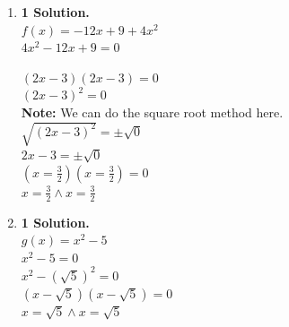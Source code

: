 \begin{example}
  \hfill
  \begin{enumerate}
  \item \textbf{1 Solution.} \\
    $f(x) = -12x + 9 + 4x^2$ \\
    $4x^2 - 12x + 9 = 0$ \\
    \begin{center}
    \end{center}
    $(2x - 3)(2x - 3) = 0$ \\
    $(2x - 3)^2 = 0$ \\
    \textbf{Note: } We can do the square root method here. \\
    $\sqrt{(2x - 3)^2} = \pm \sqrt{0}$ \\
    $2x - 3 = \pm \sqrt{0}$ \\
    $(x = \frac{3}{2}) (x = \frac{3}{2}) = 0$ \\
    $x = \frac{3}{2} \land x = \frac{3}{2}$
  \item \textbf{1 Solution.} \\
    $g(x) = x^2 - 5$ \\
    $x^2 - 5 = 0$ \\
    $x^2 - (\sqrt{5})^2 = 0$ \\
    $(x - \sqrt{5})(x - \sqrt{5}) = 0$ \\
    $x = \sqrt{5} \land x = \sqrt{5}$
  \end{enumerate}
\end{example}
